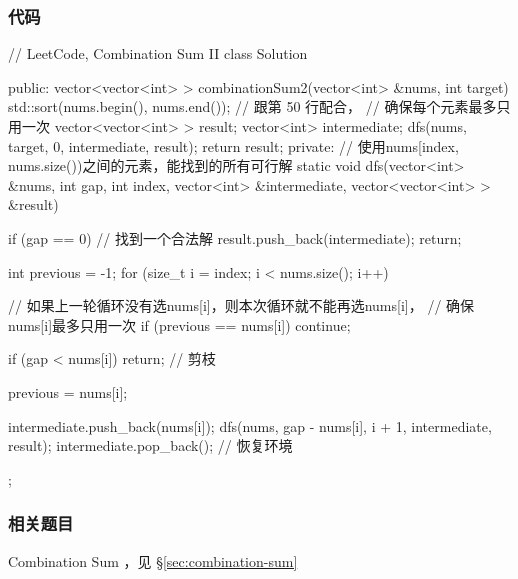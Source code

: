 \subsubsection{代码}
\begin{Code}
// LeetCode, Combination Sum II
class Solution {
public:
    vector<vector<int> > combinationSum2(vector<int> &nums, int target) {
        std::sort(nums.begin(), nums.end()); // 跟第 50 行配合，
                                             // 确保每个元素最多只用一次
        vector<vector<int> > result;
        vector<int> intermediate;
        dfs(nums, target, 0, intermediate, result);
        return result;
    }
private:
    // 使用nums[index, nums.size())之间的元素，能找到的所有可行解
    static void dfs(vector<int> &nums, int gap, int index,
            vector<int> &intermediate, vector<vector<int> > &result) {
        if (gap == 0) {  //  找到一个合法解
            result.push_back(intermediate);
            return;
        }

        int previous = -1;
        for (size_t i = index; i < nums.size(); i++) {
            // 如果上一轮循环没有选nums[i]，则本次循环就不能再选nums[i]，
            // 确保nums[i]最多只用一次
            if (previous == nums[i]) continue;

            if (gap < nums[i]) return;  // 剪枝

            previous = nums[i];

            intermediate.push_back(nums[i]);
            dfs(nums, gap - nums[i], i + 1, intermediate, result);
            intermediate.pop_back();  // 恢复环境
        }
    }
};
\end{Code}


\subsubsection{相关题目}
\begindot
\item Combination Sum ，见 \S \ref{sec:combination-sum}
\myenddot
